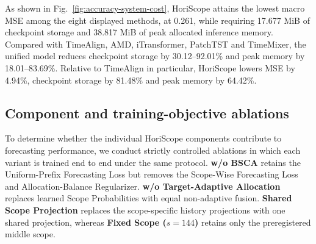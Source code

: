 \documentclass[final,3p,times]{elsarticle}
\begin{document}
As shown in Fig.~\ref{fig:accuracy-system-cost}, HoriScope attains the lowest macro MSE among the eight displayed methods, at 0.261, while requiring 17.677 MiB of checkpoint storage and 38.817 MiB of peak allocated inference memory. Compared with TimeAlign, AMD, iTransformer, PatchTST and TimeMixer, the unified model reduces checkpoint storage by 30.12--92.01\% and peak memory by 18.01--83.69\%. Relative to TimeAlign in particular, HoriScope lowers MSE by 4.94\%, checkpoint storage by 81.48\% and peak memory by 64.42\%.

\subsection{Component and training-objective ablations}
\label{sec:ablation}


To determine whether the individual HoriScope components contribute to forecasting performance, we conduct strictly controlled ablations in which each variant is trained end to end under the same protocol. \textbf{w/o BSCA} retains the Uniform-Prefix Forecasting Loss but removes the Scope-Wise Forecasting Loss and Allocation-Balance Regularizer. \textbf{w/o Target-Adaptive Allocation} replaces learned Scope Probabilities with equal non-adaptive fusion. \textbf{Shared Scope Projection} replaces the scope-specific history projections with one shared projection, whereas \textbf{Fixed Scope ($s=144$)} retains only the preregistered middle scope.
\end{document}
